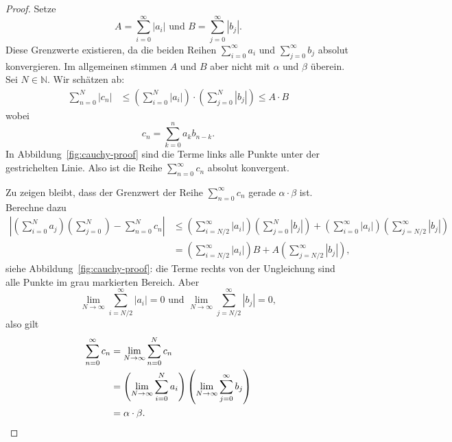 \documentclass[../main.tex]{subfiles}
\begin{document}

\begin{proof}
  Setze
  \[
    A = \sum_{i=0}^{\infty} |a_i| \text{ und }
    B = \sum_{j=0}^{\infty} |b_j|.
  \]
  Diese Grenzwerte existieren, da die beiden Reihen
  $\sum_{i=0}^{\infty} a_i$ und $\sum_{j=0}^{\infty} b_j$ 
  absolut konvergieren. Im allgemeinen stimmen $A$ und $B$
  aber nicht mit $\alpha$ und $\beta$ überein.
  Sei $N \in \mathbb{N}$. Wir schätzen ab:
  \begin{align*}
    \sum_{n=0}^{N} |c_n| &
    \leq \left(\sum_{i=0}^{N} |a_i|\right)
    \cdot \left( \sum_{j=0}^{N} |b_j| \right) \leq A \cdot B
  \end{align*}
  wobei
  \[
    c_n = \sum_{k=0}^{n} a_k b_{n-k}.
  \]
  In Abbildung~\ref{fig:cauchy-proof}
  sind die Terme links alle
  Punkte unter der
  gestrichelten Linie.
  Also ist die Reihe $\sum_{n=0}^{\infty} c_n$ absolut
  konvergent.

  Zu zeigen bleibt, dass der Grenzwert der Reihe
  $\sum_{n=0}^{\infty} c_n$ gerade $\alpha \cdot \beta$ 
  ist. Berechne dazu
  \begin{align*}
    \left| \left( \sum_{i=0}^{N} a_j \right)
    \left( \sum_{j=0}^{N}\right) - \sum_{n=0}^{N} c_n \right| 
    & \leq \left(\sum_{i=N/2}^{\infty} |a_i| \right)
     \left( \sum_{j=0}^{N} |b_j| \right)
     + \left( \sum_{i=0}^{\infty} |a_i| \right)
     \left( \sum_{j=N/2}^{\infty} |b_j| \right)\\
    &= \left( \sum_{i=N/2}^{\infty} |a_i| \right) B
    + A \left( \sum_{j=N/2}^{\infty} |b_j| \right),
  \end{align*}
  siehe Abbildung~\ref{fig:cauchy-proof}: die
  Terme rechts von der Ungleichung sind alle Punkte
  im grau markierten Bereich.
  Aber
  \[
    \lim_{N \to \infty} \sum_{i=N/2}^{\infty} |a_i| = 0
    \text{ und }
    \lim_{N \to \infty} \sum_{j=N/2}^{\infty} |b_j| = 0,
  \]
  also gilt
  \begin{align*}
    \sum_{n=0}^{\infty} c_n 
    & = \lim_{N \to \infty} \sum_{n=0}^{N} c_n \\
    & = \left( \lim_{N \to \infty}\sum_{i=0}^{N} a_i \right)
    \left( \lim_{N \to \infty}\sum_{j=0}^{\infty} b_j \right) \\
    & = \alpha \cdot \beta. && \qedhere
  \end{align*}
\end{proof}
\end{document}
